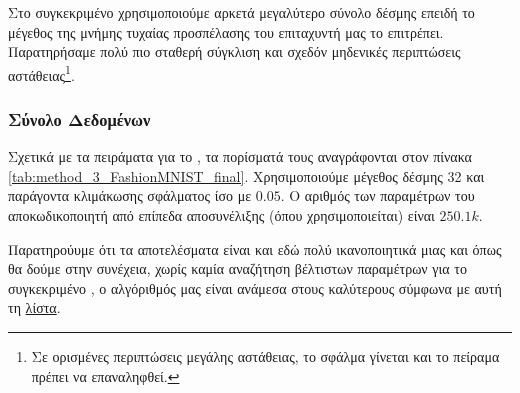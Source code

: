 Στο συγκεκριμένο  χρησιμοποιούμε αρκετά μεγαλύτερο σύνολο δέσμης επειδή το μέγεθος της μνήμης τυχαίας προσπέλασης του επιταχυντή μας το επιτρέπει. Παρατηρήσαμε πολύ πιο σταθερή σύγκλιση και σχεδόν μηδενικές περιπτώσεις αστάθειας\footnote{Σε ορισμένες περιπτώσεις μεγάλης αστάθειας, το σφάλμα γίνεται  και το πείραμα πρέπει να επαναληφθεί.}.

\subsubsection{Σύνολο Δεδομένων }

Σχετικά με τα πειράματα για το , τα πορίσματά τους αναγράφονται στον πίνακα \ref{tab:method_3_FashionMNIST_final}. Χρησιμοποιούμε μέγεθος δέσμης 32 και παράγοντα κλιμάκωσης σφάλματος ίσο με $0.05$. Ο αριθμός των παραμέτρων του αποκωδικοποιητή από επίπεδα αποσυνέλιξης (όπου χρησιμοποιείται) είναι $250.1k$.

\begin{table}[h]
    \begin{center}
    \end{center}
    \caption[]{\label{tab:method_3_FashionMNIST_final}Επίδοση των αλγορίθμων της μεθόδου 3 στο σύνολο δεδομένων , όταν χρησιμοποιούνται 30 εποχές για την εκπαίδευση του μοντέλου με μέγεθος δέσμης 32.} 
\end{table}

Παρατηρούυμε ότι τα αποτελέσματα είναι και εδώ πολύ ικανοποιητικά μιας και όπως θα δούμε στην συνέχεια, χωρίς καμία αναζήτηση βέλτιστων παραμέτρων για το συγκεκριμένο , ο αλγόριθμός μας είναι ανάμεσα στους καλύτερους σύμφωνα με αυτή τη \href{https://paperswithcode.com/sota/image-classification-on-fashion-mnist}{λίστα}.\par

